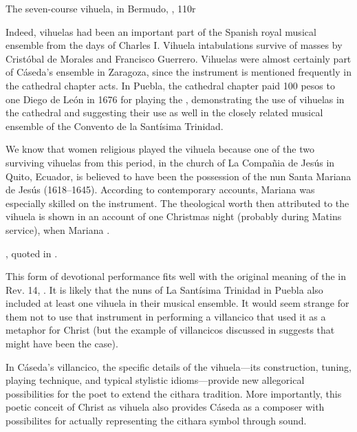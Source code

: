 {The seven-course vihuela, in Bermudo, , 110r}

Indeed, vihuelas had been an important part of the Spanish royal musical ensemble
from the days of Charles I.
Vihuela intabulations survive of masses by Cristóbal de Morales and Francisco
Guerrero.%
    \Autocite{Grove:Vihuela}
Vihuelas were almost certainly part of Cáseda's ensemble in Zaragoza, since the
instrument is mentioned frequently in the cathedral chapter acts.%
    \Autocite{Calahorra:Zaragoza2}
In Puebla, the cathedral chapter paid 100 pesos to one Diego de León in 1676
for playing the , demonstrating the use of vihuelas in
the cathedral and suggesting their use as well in the closely related musical
ensemble of the Convento de la Santísima Trinidad.%
    \Autocite[44]{PerezRuiz:Aportes}

We know that women religious played the vihuela because one of the two
surviving vihuelas from this period, in the church of La Compañia de Jesús in
Quito, Ecuador, is believed to have been the possession of the nun Santa
Mariana de Jesús (1618--1645).
According to contemporary accounts, Mariana was especially skilled on the
instrument. 
The theological worth then attributed to the vihuela is shown in an account of
one Christmas night (probably during Matins service), when Mariana .%
\begin{Footnote}
    \Autocite[275]{EspinosaPolit:SantaMariana}, quoted in
    \Autocite[73]{Bermudez:Vihuela}.
\end{Footnote}
This form of devotional performance fits well with the original meaning of the
 in Rev. 14, .%
    \Autocite{BDAG}
It is likely that the nuns of La Santísima Trinidad in Puebla also included at
least one vihuela in their musical ensemble.
It would seem strange for them not to use that instrument in performing a
villancico that used it as a metaphor for Christ (but the example of
 villancicos discussed in  suggests that might have
been the case).

In Cáseda's villancico, the specific details of the vihuela---its construction,
tuning, playing technique, and typical stylistic idioms---provide new
allegorical possibilities for the poet to extend the cithara tradition.
More importantly, this poetic conceit of Christ as vihuela also provides Cáseda
as a composer with possibilites for actually representing the cithara symbol
through sound.

